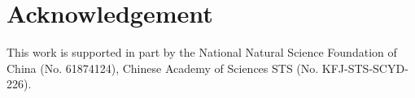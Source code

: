 \section*{Acknowledgement}
This work is supported in part by the National Natural Science Foundation 
of China (No. 61874124), Chinese Academy of Sciences STS (No. KFJ-STS-SCYD-226).
